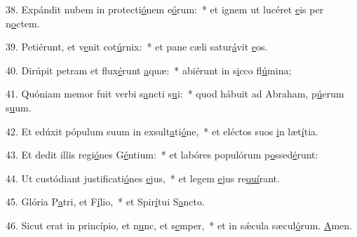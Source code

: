 38. Expándit nubem in protecti\uline{ó}nem e\uline{ó}rum:~* et ignem ut lucéret \uline{e}is per n\uline{o}ctem.\par 
39. Petiérunt, et v\uline{e}nit cot\uline{ú}rnix:~* et pane cæli satur\uline{á}vit \uline{e}os.\par 
40. Dirúpit petram et flux\uline{é}runt \uline{a}quæ:~* abiérunt in s\uline{i}cco fl\uline{ú}mina;\par 
41. Quóniam memor fuit verbi s\uline{a}ncti s\uline{u}i:~* quod hábuit ad Abraham, p\uline{ú}erum s\uline{u}um.\par 
42. Et edúxit pópulum suum in exsult\uline{a}ti\uline{ó}ne,~* et eléctos suos \uline{i}n læt\uline{í}tia.\par 
43. Et dedit illis regi\uline{ó}nes G\uline{é}ntium:~* et labóres populórum p\uline{o}ssed\uline{é}runt:\par 
44. Ut custódiant justificati\uline{ó}nes \uline{e}jus,~* et legem \uline{e}jus re\uline{quí}rant.\par 
45. Glória P\uline{a}tri, et F\uline{í}lio,~* et Spir\uline{í}tui S\uline{a}ncto.\par 
46. Sicut erat in princípio, et n\uline{u}nc, et s\uline{e}mper,~* et in sǽcula sæcul\uline{ó}rum. \uline{A}men.\par 
